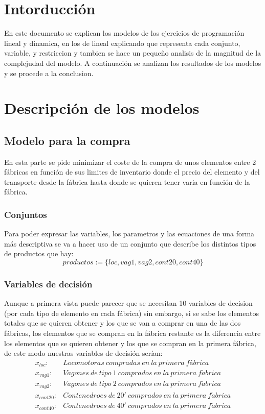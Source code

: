 \documentclass[11pt,spanish]{article}
\begin{document}


	\section{Intorducción}
	En este documento se explican los modelos de los ejercicios de programación lineal y dinamica, en los de lineal explicando que representa cada conjunto, variable, y restriccion y tambien se hace un pequeño analisis de la magnitud de la complejudad del modelo. A continuación se analizan los resultados de los modelos y se procede a la conclusion.

	\section{Descripción de los modelos}
		\subsection{Modelo para la compra}
			En esta parte se pide minimizar el coste de la compra de unos elementos entre 2 fábricas en función de sus limites de inventario donde el precio del elemento y del transporte desde la fábrica hasta donde se quieren tener varia en función de la fábrica.
			\subsubsection{Conjuntos}
			Para poder expresar las variables, los parametros y las ecuaciones de una forma más descriptiva se va a hacer uso de un conjunto que describe los distintos tipos de productos que hay:
			$$ productos := \{loc, vag1, vag2, cont20, cont40\} $$
			\subsubsection{Variables de decisión}
			Aunque a primera vista puede parecer que se necesitan 10 variables de decision (por cada tipo de elemento en cada fábrica) sin embargo, si se sabe los elementos totales que se quieren obtener y los que se van a comprar en una de las dos fábricas, los elementos que se compran en la fábrica restante es la diferencia entre los elementos que se quieren obtener y los que se compran en la primera fábrica, de este modo nuestras variables de decisión serían:
			\begin{align*}
			x_{loc}:& Locomotoras\ compradas\ en\ la\ primera\ fábrica \\
			x_{vag1}:& Vagones\ de\ tipo\ 1\ comprados\ en\ la\ primera\ f\acute{a}brica \\
			x_{vag2}:& Vagones\ de\ tipo\ 2\ comprados\ en\ la\ primera\ f\acute{a}brica \\
			x_{cont20}:& Contenedroes\ de\ 20'\ comprados\ en\ la\ primera\ f\acute{a}brica \\
			x_{cont40}:& Contenedroes\ de\ 40'\ comprados\ en\ la\ primera\ f\acute{a}brica 
			\end{align*}
			
\end{document}
